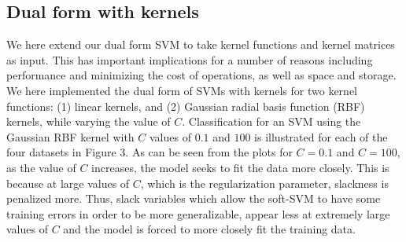 \documentclass{article}
\begin{document}
\subsection{Dual form with kernels}
We here extend our dual form SVM to take kernel functions and kernel matrices as input. This has important implications for a number of reasons including performance and minimizing the cost of operations, as well as space and storage. We here implemented the dual form of SVMs with kernels for two kernel functions: (1) linear kernels, and (2) Gaussian radial basis function (RBF) kernels, while varying the value of $C$. Classification for an SVM using the Gaussian RBF kernel with $C$ values of $0.1$ and $100$ is illustrated for each of the four datasets in Figure 3. As can be seen from the plots for $C=0.1$ and $C=100$, as the value of $C$ increases, the model seeks to fit the data more closely. This is because at large values of $C$, which is the regularization parameter, slackness is penalized more. Thus, slack variables which allow the soft-SVM to have some training errors in order to be more generalizable, appear less at extremely large values of $C$ and the model is forced to more closely fit the training data.
\end{document}

